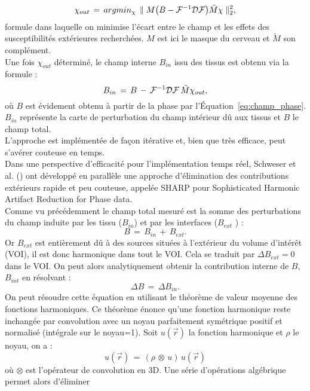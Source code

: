 {\begin{equation}
\chi_{out}\,=\,argmin_{\chi}\,\parallel M\bigl(B-{\cal F}^{-1}{\cal D}{\cal F}\bigr)\tilde{M}\chi\parallel_2^2,
\end{equation}
formule dans laquelle on minimise l’écart entre le champ et les effets des susceptibilités extérieures recherchées. $M$ est ici le masque du cerveau et $\tilde{M}$ son complément.\\
Une fois $\chi_{out}$ déterminé, le champ interne $B_{in}$ issu des tissus est obtenu via la formule :
\begin{equation}
B_{in}\,=\,B\,-\,{\cal F}^{-1}{\cal D}{\cal F}\,\tilde{M}\chi_{out},
\end{equation}
où $B$ est évidement obtenu à partir de la phase par l’Équation~\ref{eq:champ_phase}. $B_{in}$ représente la carte de
perturbation du champ intérieur dû aux tissus et $B$ le champ total.\\
L’approche est implémentée de façon itérative et, bien que très efficace, peut s’avérer couteuse en
temps.\\
Dans une perspective d’efficacité pour l’implémentation temps réel, Schweser et al. (\cite{Schweser2011}) ont
développé en parallèle une approche d’élimination des contributions extérieurs rapide et peu
couteuse, appelée SHARP pour Sophisticated Harmonic Artifact Reduction for Phase data.\\
Comme vu précédemment le champ total mesuré est la somme des perturbations du champ induite
par les tissu ($B_{in}$) et par les interfaces ($B_{ext}$ ) :
\begin{equation}
B\,=\,B_{in}\,+\,B_{ext}.
\end{equation}
Or $B_{ext}$ est entièrement dû à des sources situées à l’extérieur du volume d’intérêt (VOI), il est donc
harmonique dans tout le VOI. Cela se traduit par $\Delta B_{ext} = 0$ dans le VOI. On peut alors analytiquement
obtenir la contribution interne de $B$, $B_{int}$ en résolvant :
\begin{equation}
\Delta B\,=\,\Delta B_{in}.
\end{equation}
On peut résoudre cette équation en utilisant le théorème de valeur moyenne des fonctions
harmoniques. Ce théorème énonce qu'une fonction harmonique reste inchangée par convolution avec
un noyau parfaitement symétrique positif et normalisé (intégrale sur le noyau=1). Soit $u(\vec{r})$ la fonction
harmonique et $\rho$ le noyau, on a :
\begin{equation}
u(\vec{r})\,=\,(\rho\, \otimes\,u)\,u(\vec{r})
\end{equation}
où $\otimes$ est l'opérateur de convolution en 3D. Une série d’opérations algébrique permet alors d'éliminer
}

